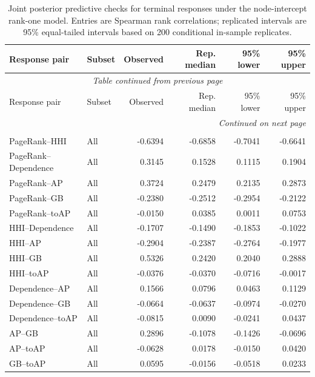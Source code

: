 \documentclass[pdftex,12pt,openright,a4paper,oneside]{book}
\begin{document}
\begingroup
\small
\setlength{\LTleft}{0pt}
\setlength{\LTright}{0pt}
\begin{longtable}{llrrrr}
\caption{Joint posterior predictive checks for terminal responses under the node-intercept rank-one model. Entries are Spearman rank correlations; replicated intervals are 95\% equal-tailed intervals based on 200 conditional in-sample replicates.}
\label{tab:node_terminal_joint_ppc_full}\\
\toprule
Response pair & Subset & Observed & Rep. median & 95\% lower & 95\% upper \\
\midrule
\endfirsthead
\multicolumn{6}{c}{\textit{Table continued from previous page}}\\
\toprule
Response pair & Subset & Observed & Rep. median & 95\% lower & 95\% upper \\
\midrule
\endhead
\midrule
\multicolumn{6}{r}{\textit{Continued on next page}}\\
\endfoot
\bottomrule
\endlastfoot
\multicolumn{6}{l}{\textit{All terminals}}\\
\midrule
PageRank--HHI & All & -0.6394 & -0.6858 & -0.7041 & -0.6641 \\
PageRank--Dependence & All & 0.3145 & 0.1528 & 0.1115 & 0.1904 \\
PageRank--AP & All & 0.3724 & 0.2479 & 0.2135 & 0.2873 \\
PageRank--GB & All & -0.2380 & -0.2512 & -0.2954 & -0.2122 \\
PageRank--toAP & All & -0.0150 & 0.0385 & 0.0011 & 0.0753 \\
HHI--Dependence & All & -0.1707 & -0.1490 & -0.1853 & -0.1022 \\
HHI--AP & All & -0.2904 & -0.2387 & -0.2764 & -0.1977 \\
HHI--GB & All & 0.5326 & 0.2420 & 0.2040 & 0.2888 \\
HHI--toAP & All & -0.0376 & -0.0370 & -0.0716 & -0.0017 \\
Dependence--AP & All & 0.1566 & 0.0796 & 0.0463 & 0.1129 \\
Dependence--GB & All & -0.0664 & -0.0637 & -0.0974 & -0.0270 \\
Dependence--toAP & All & -0.0815 & 0.0090 & -0.0241 & 0.0437 \\
AP--GB & All & 0.2896 & -0.1078 & -0.1426 & -0.0696 \\
AP--toAP & All & -0.0628 & 0.0178 & -0.0150 & 0.0420 \\
GB--toAP & All & 0.0595 & -0.0156 & -0.0518 & 0.0233 \\
\midrule

\end{longtable}
\end{document}
